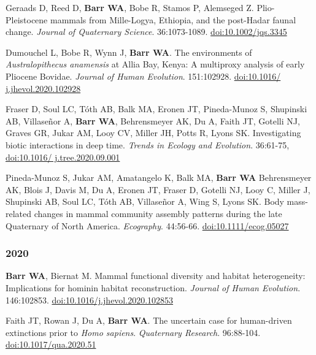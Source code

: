 \begin{etaremune}
\item Geraads D, Reed D, {\bfseries Barr WA}, Bobe R, Stamos P, Alemseged Z. Plio-Pleistocene mammals from Mille-Logya, Ethiopia, and the post-Hadar faunal change. \emph{Journal of Quaternary Science}. 36:1073-1089. \href{https://doi.org/10.1002/jqs.3345}{doi:10.1002/jqs.3345}

\item Dumouchel L, Bobe R, Wynn J, {\bfseries Barr WA}. The environments of \emph{Australopithecus anamensis} at Allia Bay, Kenya: A multiproxy analysis of early Pliocene Bovidae. \emph{Journal of Human Evolution}. 151:102928. \href{https://doi.org/10.1016/j.jhevol.2020.102928}{doi:10.1016/ j.jhevol.2020.102928}

\item Fraser D, Soul LC, Tóth AB, Balk MA, Eronen JT, Pineda-Munoz S, Shupinski AB, Villaseñor A, {\bfseries Barr WA}, Behrensmeyer AK, Du A, Faith JT, Gotelli NJ, Graves GR, Jukar AM, Looy CV, Miller JH, Potts R, Lyons SK. Investigating biotic interactions in deep time. \emph{Trends in Ecology and Evolution}. 36:61-75, \href{https://doi.org/10.1016/j.tree.2020.09.001}{doi:10.1016/ j.tree.2020.09.001} 

\item Pineda-Munoz S, Jukar AM, Amatangelo K, Balk MA, {\bfseries Barr WA} Behrensmeyer AK, Blois J, Davis M, Du A, Eronen JT, Fraser D, Gotelli NJ, Looy C, Miller J, Shupinski AB, Soul LC, Tóth AB, Villaseñor A, Wing S, Lyons SK. Body mass-related changes in mammal community assembly patterns during the late Quaternary of North America. \emph{Ecography}. 44:56-66. \href{https://dx.doi.org/10.1111/ecog.05027}{doi:10.1111/ecog.05027}


\subsubsection*{2020}



\item {\bfseries Barr WA}, Biernat M. Mammal functional diversity and habitat heterogeneity: Implications for hominin habitat reconstruction. \emph{Journal of Human Evolution}. 146:102853. \href{https://dx.doi.org/10.1016/j.jhevol.2020.102853}{doi:10.1016/j.jhevol.2020.102853}

\item Faith JT, Rowan J, Du A, {\bfseries Barr WA}. The uncertain case for human-driven extinctions prior to \emph{Homo sapiens}. \emph{Quaternary Research}. 96:88-104. \href{https://dx.doi.org/10.1017/qua.2020.51}{doi:10.1017/qua.2020.51}


\end{etaremune}
